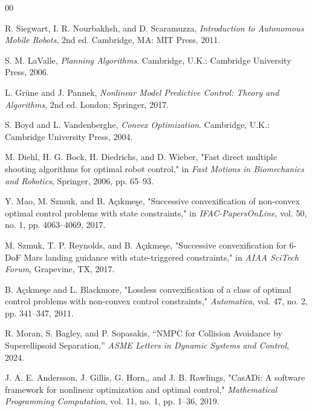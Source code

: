 \documentclass[conference]{IEEEtran}
\begin{document}
\begin{thebibliography}{00}

R. Siegwart, I. R. Nourbakhsh, and D. Scaramuzza, \textit{Introduction to Autonomous Mobile Robots}, 2nd ed. Cambridge, MA: MIT Press, 2011.

S. M. LaValle, \textit{Planning Algorithms}. Cambridge, U.K.: Cambridge University Press, 2006.

L. Grüne and J. Pannek, \textit{Nonlinear Model Predictive Control: Theory and Algorithms}, 2nd ed. London: Springer, 2017.

S. Boyd and L. Vandenberghe, \textit{Convex Optimization}. Cambridge, U.K.: Cambridge University Press, 2004.

M. Diehl, H. G. Bock, H. Diedrichs, and D. Wieber, "Fast direct multiple shooting algorithms for optimal robot control," in \textit{Fast Motions in Biomechanics and Robotics}, Springer, 2006, pp. 65–93.

Y. Mao, M. Szmuk, and B. Açıkmeşe, "Successive convexification of non-convex optimal control problems with state constraints," in \textit{IFAC-PapersOnLine}, vol. 50, no. 1, pp. 4063–4069, 2017.

M. Szmuk, T. P. Reynolds, and B. Açıkmeşe, "Successive convexification for 6-DoF Mars landing guidance with state-triggered constraints," in \textit{AIAA SciTech Forum}, Grapevine, TX, 2017.

B. Açıkmeşe and L. Blackmore, "Lossless convexification of a class of optimal control problems with non-convex control constraints," \textit{Automatica}, vol. 47, no. 2, pp. 341–347, 2011.

R. Moran, S. Bagley, and P. Sopasakis, “NMPC for Collision Avoidance by Superellipsoid Separation,” \textit{ASME Letters in Dynamic Systems and Control}, 2024.

J. A. E. Andersson, J. Gillis, G. Horn,, and J. B. Rawlings, "CasADi: A software framework for nonlinear optimization and optimal control," \textit{Mathematical Programming Computation}, vol. 11, no. 1, pp. 1–36, 2019.


\end{thebibliography}
\end{document}
